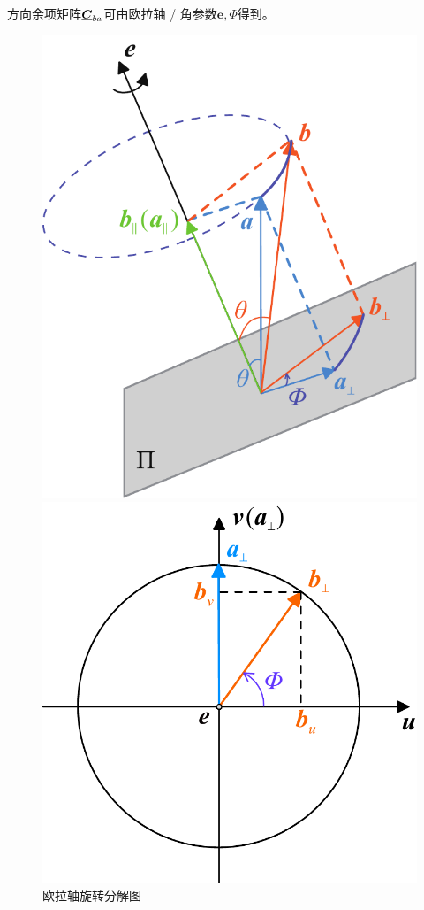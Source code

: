 方向余项矩阵$\underline{\bm{C}}_{ba}$可由欧拉轴 / 角参数$\bm{e}, \varPhi$得到。
\begin{figure}[!htb]
	\begin{minipage}{0.31\linewidth}
		\centering
		\includegraphics[width=0.9\linewidth]{pic/欧拉轴}
		\vspace*{-1.2em}
		\caption{欧拉轴旋转分解图}
		\label{欧拉轴}
	\end{minipage}
	\begin{minipage}{0.33\linewidth}
		\centering
		\includegraphics[width=\linewidth]{pic/欧拉轴2}

\end{minipage}
\end{figure}

